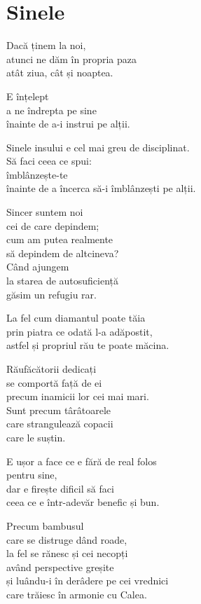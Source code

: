
\chapter{Sinele}


Dacă ținem la noi,\\
atunci ne dăm în propria paza\\
atât ziua, cât și noaptea.


E înțelept\\
a ne îndrepta pe sine\\
înainte de a-i instrui pe alții.


Sinele insului e cel mai greu de disciplinat.\\
Să faci ceea ce spui:\\
îmblânzește-te\\
înainte de a încerca să-i îmblânzești pe alții.


Sincer suntem noi\\
cei de care depindem;\\
cum am putea realmente\\
să depindem de altcineva?\\
Când ajungem\\
la starea de autosuficiență\\
găsim un refugiu rar.


La fel cum diamantul poate tăia\\
prin piatra ce odată l-a adăpostit,\\
astfel și propriul rău te poate măcina.


Răufăcătorii dedicați\\
se comportă față de ei\\
precum inamicii lor cei mai mari.\\
Sunt precum târâtoarele\\
care strangulează copacii\\
care le suștin.


E ușor a face ce e fără de real folos\\
pentru sine,\\
dar e firește dificil să faci\\
ceea ce e într-adevăr benefic și bun.


Precum bambusul\\
care se distruge dând roade,\\
la fel se rănesc și cei necopți\\
având perspective greșite\\
și luându-i în derâdere pe cei vrednici\\
care trăiesc în armonie cu Calea.


